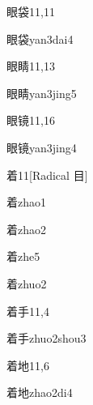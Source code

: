 \begin{entry}{眼袋}{11,11}
  \begin{phonetics}{眼袋}{yan3dai4}
  \end{phonetics}
\end{entry}

\begin{entry}{眼睛}{11,13}
  \begin{phonetics}{眼睛}{yan3jing5}
  \end{phonetics}
\end{entry}

\begin{entry}{眼镜}{11,16}
  \begin{phonetics}{眼镜}{yan3jing4}
  \end{phonetics}
\end{entry}

\begin{entry}{着}{11}[Radical 目]
  \begin{phonetics}{着}{zhao1}
  \end{phonetics}
  \begin{phonetics}{着}{zhao2}
  \end{phonetics}
  \begin{phonetics}{着}{zhe5}
  \end{phonetics}
  \begin{phonetics}{着}{zhuo2}
  \end{phonetics}
\end{entry}

\begin{entry}{着手}{11,4}
  \begin{phonetics}{着手}{zhuo2shou3}
  \end{phonetics}
\end{entry}

\begin{entry}{着地}{11,6}
  \begin{phonetics}{着地}{zhao2di4}
  \end{phonetics}
\end{entry}

